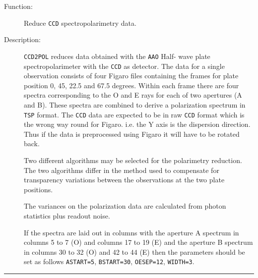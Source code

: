 \documentclass[11pt,twoside]{article}
\renewcommand{\_}{\texttt{\symbol{95}}}
\newcommand{\manrule}{\rule{\textwidth}{0.5mm}}
\newenvironment{manroutinedescription}{\begin{description}}{\end{description}%
\manrule}
\newcommand{\manroutineitem}[2]{\item[#1:] #2\mbox{}}
\newcommand{\mantt}{\tt}
\begin{document}
\begin{manroutinedescription}
\manroutineitem{Function}{}
        Reduce {\mantt{CCD}} spectropolarimetry data.

\manroutineitem{Description}{}
        {\mantt{CCD2POL}} reduces data obtained with the {\mantt{AAO}} Half-%
wave plate
        spectropolarimeter with the {\mantt{CCD}} as detector. The data for a
        single observation consists of four Figaro files containing the
        frames for plate position 0, 45, 22.5 and 67.5 degrees. Within each
        frame there are four spectra corresponding to the O and E rays for
        each of two apertures (A and B). These spectra are combined
        to derive a polarization spectrum in {\mantt{TSP}} format.
        The {\mantt{CCD}} data are expected to be in raw {\mantt{CCD}} format %
which is
        the wrong way round for Figaro. i.e. the Y axis is the dispersion
        direction. Thus if the data is preprocessed using Figaro it will
        have to be rotated back.

        Two different algorithms may be selected for the polarimetry
        reduction. The two algorithms differ in the method used to
        compensate for transparency variations between the observations
        at the two plate positions.

        The variances on the polarization data are calculated from photon
        statistics plus readout noise.

        If the spectra are laid out in columns with the
        aperture A spectrum in columns 5 to 7 (O) and columns 17 to 19 (E)
        and the aperture B spectrum in columns 30 to 32 (O) and 42 to 44 (E)
        then the parameters should be set as follows {\mantt{ASTART=5}}, {%
\mantt{BSTART=30}},
        {\mantt{OESEP=12}}, {\mantt{WIDTH=3}}.



\end{manroutinedescription}
\end{document}
